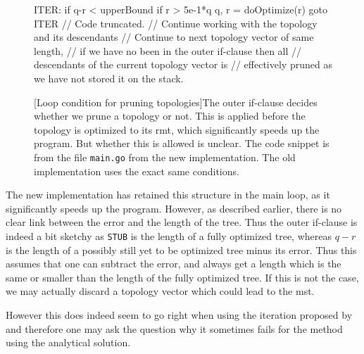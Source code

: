 \begin{figure}[htbp]
  \begin{go-code}
    ITER:
    if q-r < upperBound {
      if r > 5e-1*q {
        q, r = doOptimize(r)
        goto ITER
      }
      // Code truncated.
      // Continue working with the topology and its descendants
    }
    // Continue to next topology vector of same length,
    // if we have no been in the outer if-clause then all
    // descendants of the current topology vector is 
    // effectively pruned as we have not stored it on the stack.
  \end{go-code}
  [Loop condition for pruning topologies]{The outer if-clause
    decides whether we prune a topology or not. This is applied before the
    topology is optimized to its \acs{rmt}, which significantly speeds up the
    program. But whether this is allowed is unclear. The code snippet is from
    the file \texttt{main.go} from the new implementation. The old
    implementation uses the exact same conditions.\label{fig:loop-condition-pruning}}
\end{figure}

The new implementation has retained this structure in the main loop, as it
significantly speeds up the program. However, as described earlier, there is no
clear link between the error and the length of the tree. Thus the outer
if-clause is indeed a bit sketchy as \texttt{STUB} is the length of a fully
optimized tree, whereas $q - r$ is the length of a possibly still yet to be optimized
tree minus its error. Thus this assumes that one can subtract the error, and
always get a length which is the same or smaller than the length of the fully
optimized tree. If this is not the case, we may actually discard a topology
vector which could lead to the \ac{mst}.

However this does indeed seem to go right when using the iteration proposed by
\textcite{smith1992} and therefore one may ask the question why it sometimes
fails for the method using the analytical solution.

